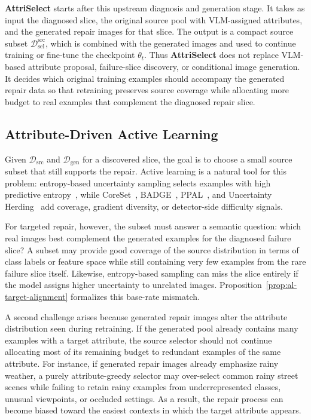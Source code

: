 \documentclass{article}
\newcommand{\modelname}{AttriSelect}
\newcommand{\model}{\textcolor{darkteal}{\textbf{\modelname}}\xspace}
\newcommand{\dataset}{\mathcal{D}}
\begin{document}
\model starts after this upstream diagnosis and generation stage. It takes as input the diagnosed slice, the original source pool with VLM-assigned attributes, and the generated repair images for that slice. The output is a compact source subset $\dataset_{\mathrm{sel}}^{\mathrm{src}}$, which is combined with the generated images and used to continue training or fine-tune the checkpoint $\theta_t$. Thus \model does not replace VLM-based attribute proposal, failure-slice discovery, or conditional image generation. It decides which original training examples should accompany the generated repair data so that retraining preserves source coverage while allocating more budget to real examples that complement the diagnosed repair slice.

\subsection{Attribute-Driven Active Learning}

Given $\dataset_{\mathrm{src}}$ and $\dataset_{\mathrm{gen}}$ for a discovered slice, the goal is to choose a small source subset that still supports the repair. Active learning is a natural tool for this problem: entropy-based uncertainty sampling selects examples with high predictive entropy~\citep{settles2009active}, while CoreSet~\citep{sener2018active}, BADGE~\citep{ash2020deep}, PPAL~\citep{yang2024ppal}, and Uncertainty Herding~\citep{bae2025uncertainty} add coverage, gradient diversity, or detector-side difficulty signals.

For targeted repair, however, the subset must answer a semantic question: which real images best complement the generated examples for the diagnosed failure slice? A subset may provide good coverage of the source distribution in terms of class labels or feature space while still containing very few examples from the rare failure slice itself. Likewise, entropy-based sampling can miss the slice entirely if the model assigns higher uncertainty to unrelated images. Proposition~\ref{prop:al-target-alignment} formalizes this base-rate mismatch.

A second challenge arises because generated repair images alter the attribute distribution seen during retraining. If the generated pool already contains many examples with a target attribute, the source selector should not continue allocating most of its remaining budget to redundant examples of the same attribute. For instance, if generated repair images already emphasize rainy weather, a purely attribute-greedy selector may over-select common rainy street scenes while failing to retain rainy examples from underrepresented classes, unusual viewpoints, or occluded settings. As a result, the repair process can become biased toward the easiest contexts in which the target attribute appears.
\end{document}

